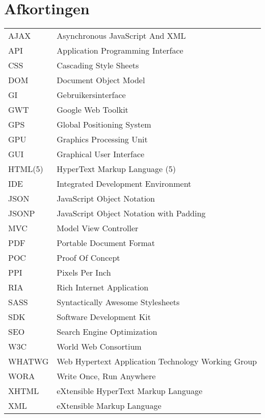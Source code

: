 \documentclass[master=cws,dutch,masteroption={vs,gs},inputenc=utf8]{kulemt}
\begin{document}
\section*{Afkortingen}
\begin{flushleft}
  \renewcommand{\arraystretch}{1.1}
  \begin{tabularx}{\textwidth}{@{}p{2cm}X@{}}
     AJAX & Asynchronous JavaScript And XML \\
     API & Application Programming Interface \\
     CSS & Cascading Style Sheets \\
     DOM & Document Object Model \\
     GI & Gebruikersinterface \\
     GWT & Google Web Toolkit \\
     GPS & Global Positioning System \\
     GPU & Graphics Processing Unit \\
     GUI & Graphical User Interface \\
     HTML(5) & HyperText Markup Language (5) \\
     IDE & Integrated Development Environment \\
     JSON & JavaScript Object Notation \\
     JSONP & JavaScript Object Notation with Padding \\
     MVC & Model View Controller \\
     PDF & Portable Document Format \\
     POC & Proof Of Concept \\
     PPI & Pixels Per Inch \\
     RIA & Rich Internet Application \\
     SASS & Syntactically Awesome Stylesheets \\
     SDK & Software Development Kit \\
     SEO & Search Engine Optimization \\
     W3C & World Web Consortium \\
     WHATWG & Web Hypertext Application Technology Working Group \\
     WORA & Write Once, Run Anywhere \\
     XHTML & eXtensible HyperText Markup Language \\ 
     XML & eXtensible Markup Language
  \end{tabularx}
\end{flushleft}
\end{document}

